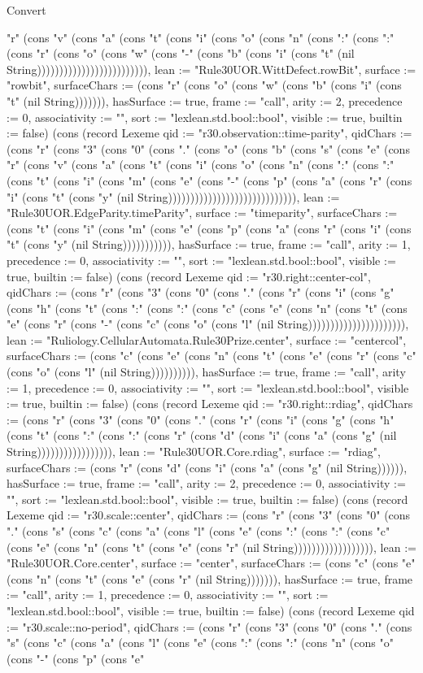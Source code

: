 \begin{lexlean}{Convert}
\begin{semanticmodule}
{"r" (cons "v" (cons "a" (cons "t" (cons "i" (cons "o" (cons "n" (cons ":" (cons ":" (cons "r" (cons "o" (cons "w" (cons "-" (cons "b" (cons "i" (cons "t" (nil String))))))))))))))))))))))))), lean := "Rule30UOR.WittDefect.rowBit", surface := "rowbit", surfaceChars := (cons "r" (cons "o" (cons "w" (cons "b" (cons "i" (cons "t" (nil String))))))), hasSurface := true, frame := "call", arity := 2, precedence := 0, associativity := "", sort := "lexlean.std.bool::bool", visible := true, builtin := false}) (cons (record Lexeme {qid := "r30.observation::time-parity", qidChars := (cons "r" (cons "3" (cons "0" (cons "." (cons "o" (cons "b" (cons "s" (cons "e" (cons "r" (cons "v" (cons "a" (cons "t" (cons "i" (cons "o" (cons "n" (cons ":" (cons ":" (cons "t" (cons "i" (cons "m" (cons "e" (cons "-" (cons "p" (cons "a" (cons "r" (cons "i" (cons "t" (cons "y" (nil String))))))))))))))))))))))))))))), lean := "Rule30UOR.EdgeParity.timeParity", surface := "timeparity", surfaceChars := (cons "t" (cons "i" (cons "m" (cons "e" (cons "p" (cons "a" (cons "r" (cons "i" (cons "t" (cons "y" (nil String))))))))))), hasSurface := true, frame := "call", arity := 1, precedence := 0, associativity := "", sort := "lexlean.std.bool::bool", visible := true, builtin := false}) (cons (record Lexeme {qid := "r30.right::center-col", qidChars := (cons "r" (cons "3" (cons "0" (cons "." (cons "r" (cons "i" (cons "g" (cons "h" (cons "t" (cons ":" (cons ":" (cons "c" (cons "e" (cons "n" (cons "t" (cons "e" (cons "r" (cons "-" (cons "c" (cons "o" (cons "l" (nil String)))))))))))))))))))))), lean := "Ruliology.CellularAutomata.Rule30Prize.center", surface := "centercol", surfaceChars := (cons "c" (cons "e" (cons "n" (cons "t" (cons "e" (cons "r" (cons "c" (cons "o" (cons "l" (nil String)))))))))), hasSurface := true, frame := "call", arity := 1, precedence := 0, associativity := "", sort := "lexlean.std.bool::bool", visible := true, builtin := false}) (cons (record Lexeme {qid := "r30.right::rdiag", qidChars := (cons "r" (cons "3" (cons "0" (cons "." (cons "r" (cons "i" (cons "g" (cons "h" (cons "t" (cons ":" (cons ":" (cons "r" (cons "d" (cons "i" (cons "a" (cons "g" (nil String))))))))))))))))), lean := "Rule30UOR.Core.rdiag", surface := "rdiag", surfaceChars := (cons "r" (cons "d" (cons "i" (cons "a" (cons "g" (nil String)))))), hasSurface := true, frame := "call", arity := 2, precedence := 0, associativity := "", sort := "lexlean.std.bool::bool", visible := true, builtin := false}) (cons (record Lexeme {qid := "r30.scale::center", qidChars := (cons "r" (cons "3" (cons "0" (cons "." (cons "s" (cons "c" (cons "a" (cons "l" (cons "e" (cons ":" (cons ":" (cons "c" (cons "e" (cons "n" (cons "t" (cons "e" (cons "r" (nil String)))))))))))))))))), lean := "Rule30UOR.Core.center", surface := "center", surfaceChars := (cons "c" (cons "e" (cons "n" (cons "t" (cons "e" (cons "r" (nil String))))))), hasSurface := true, frame := "call", arity := 1, precedence := 0, associativity := "", sort := "lexlean.std.bool::bool", visible := true, builtin := false}) (cons (record Lexeme {qid := "r30.scale::no-period", qidChars := (cons "r" (cons "3" (cons "0" (cons "." (cons "s" (cons "c" (cons "a" (cons "l" (cons "e" (cons ":" (cons ":" (cons "n" (cons "o" (cons "-" (cons "p" (cons "e" }
\end{semanticmodule}
\end{lexlean}
